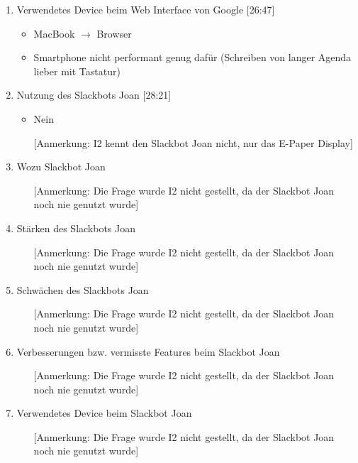 \begin{enumerate}
    \item Verwendetes Device beim Web Interface von Google [26:47]
     \begin{itemize}
        \item MacBook $\rightarrow$ Browser
        \item Smartphone nicht performant genug dafür (Schreiben von langer Agenda lieber mit Tastatur)
    \end{itemize}
    
    \item Nutzung des Slackbots Joan [28:21]
     \begin{itemize}
        \item Nein
        \item[] [Anmerkung: I2 kennt den Slackbot Joan nicht, nur das E-Paper Display]
    \end{itemize}
    
    \item Wozu Slackbot Joan
     \begin{itemize}
        \item[] [Anmerkung: Die Frage wurde I2 nicht gestellt, da der Slackbot Joan noch nie genutzt wurde] 
    \end{itemize}
    
    \item Stärken des Slackbots Joan
     \begin{itemize}
        \item[] [Anmerkung: Die Frage wurde I2 nicht gestellt, da der Slackbot Joan noch nie genutzt wurde] 
    \end{itemize}
    
    \item Schwächen des Slackbots Joan
     \begin{itemize}
        \item[] [Anmerkung: Die Frage wurde I2 nicht gestellt, da der Slackbot Joan noch nie genutzt wurde] 
    \end{itemize}
    
    \item Verbesserungen bzw. vermisste Features beim Slackbot Joan
     \begin{itemize}
        \item[] [Anmerkung: Die Frage wurde I2 nicht gestellt, da der Slackbot Joan noch nie genutzt wurde] 
    \end{itemize}
    
    \item Verwendetes Device beim Slackbot Joan
     \begin{itemize}
        \item[] [Anmerkung: Die Frage wurde I2 nicht gestellt, da der Slackbot Joan noch nie genutzt wurde] 
    \end{itemize}
    

\end{enumerate}
